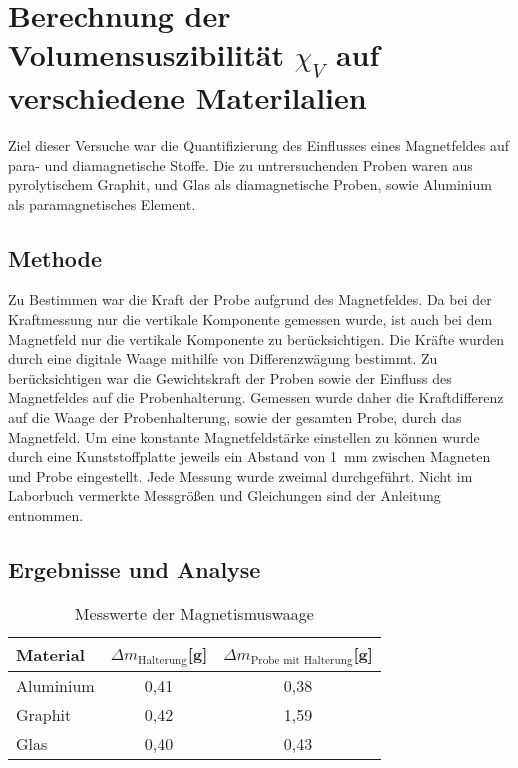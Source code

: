 
\section[Volumensuzebilität $\chi_V$]{Berechnung der Volumensuszibilität $\chi_V$ auf verschiedene Materilalien}
Ziel dieser Versuche war die Quantifizierung des Einflusses eines Magnetfeldes auf para- und diamagnetische Stoffe. Die zu untrersuchenden Proben waren aus pyrolytischem Graphit, und Glas als diamagnetische Proben, sowie Aluminium als paramagnetisches Element.\\
\subsection{Methode}
Zu Bestimmen war die Kraft der Probe aufgrund des Magnetfeldes. Da bei der Kraftmessung nur die vertikale Komponente gemessen wurde, ist auch bei dem Magnetfeld nur die vertikale Komponente zu berücksichtigen. Die Kräfte wurden durch eine digitale Waage mithilfe von Differenzwägung bestimmt.
 Zu berücksichtigen war die Gewichtskraft der Proben sowie der Einfluss des Magnetfeldes auf die Probenhalterung.
 Gemessen wurde daher die Kraftdifferenz auf die Waage der Probenhalterung, sowie der gesamten Probe, durch das Magnetfeld.
Um eine konstante Magnetfeldstärke einstellen zu können wurde durch eine Kunststoffplatte jeweils ein Abstand von \SI{1}{mm} zwischen Magneten und Probe eingestellt. Jede Messung wurde zweimal durchgeführt. Nicht im Laborbuch vermerkte Messgrößen und Gleichungen sind der Anleitung entnommen. 

\subsection{Ergebnisse und Analyse}


\begin{table}[h]

\caption{Messwerte der Magnetismuswaage}
\begin{center}
\begin{tabular}{|l|c|c|}

\hline
Material&$\Delta m_{\textrm{Halterung}}$[g]&$\Delta m_{\textrm{Probe mit Halterung}}$[g]\\
\hline
Aluminium &0,41&0,38\\
\hline
Graphit&0,42&1,59
\\ \hline
Glas&0,40&0,43
\\ \hline

\end{tabular}
\end{center}
\label{vsus}

\end{table}

